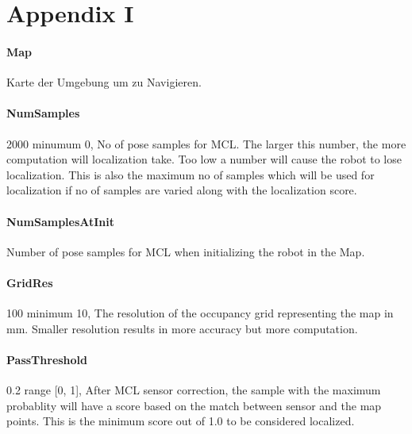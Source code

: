 \documentclass{article}
\begin{document}


\newpage


\appendix
\section{Appendix I}

\paragraph{Map}          Karte der Umgebung um zu Navigieren. 

\paragraph{NumSamples} 2000           minumum 0,  No of pose samples for MCL. The larger
                          this number, the more computation will localization
                          take. Too low a number will cause the robot to lose
                          localization. This is also the maximum no of samples
                          which will be used for localization if no of samples
                          are varied along with the localization score.
\paragraph{NumSamplesAtInit} Number of pose samples for MCL when initializing the robot in the Map.
\paragraph{GridRes} 100               minimum 10,  The resolution of the occupancy grid
                          representing the map in mm. Smaller resolution
                          results in more accuracy but more computation.

\paragraph{PassThreshold} 0.2         range [0, 1],  After MCL sensor correction, the
                          sample with the maximum probablity will have a score
                          based on the match between sensor and the map
                          points. This is the minimum score out of 1.0 to be
                          considered localized.
\end{document}
